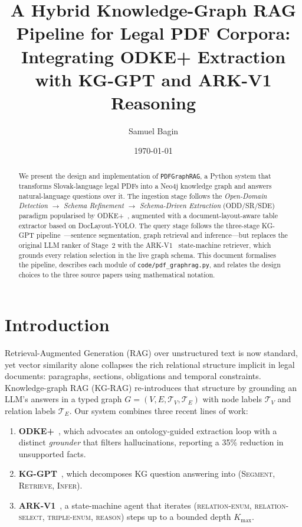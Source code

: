 \documentclass[11pt,a4paper]{article}
\title{A Hybrid Knowledge-Graph RAG Pipeline for Legal PDF Corpora:\\
Integrating ODKE+ Extraction with KG-GPT and ARK-V1 Reasoning}
\author{Samuel Bagin}
\date{\today}
\begin{document}
\maketitle

\begin{abstract}
We present the design and implementation of \texttt{PDFGraphRAG}, a Python system
that transforms Slovak-language legal PDFs into a Neo4j knowledge graph and
answers natural-language questions over it. The ingestion stage follows the
\emph{Open-Domain Detection $\rightarrow$ Schema Refinement $\rightarrow$
Schema-Driven Extraction} (ODD/SR/SDE) paradigm popularised by
ODKE+~\cite{odkeplus2025}, augmented with a document-layout-aware table
extractor based on DocLayout-YOLO. The query stage follows the three-stage
KG-GPT pipeline~\cite{kggpt2023}---sentence segmentation, graph retrieval and
inference---but replaces the original LLM ranker of Stage~2 with the
ARK-V1~\cite{arkv12025} state-machine retriever, which grounds every relation
selection in the live graph schema. This document formalises the pipeline,
describes each module of \texttt{code/pdf\_graphrag.py}, and relates the design
choices to the three source papers using mathematical notation.
\end{abstract}

\section{Introduction}

Retrieval-Augmented Generation (RAG) over unstructured text is now standard,
yet vector similarity alone collapses the rich relational structure implicit
in legal documents: paragraphs, sections, obligations and temporal
constraints. Knowledge-graph RAG (KG-RAG) re-introduces that structure by
grounding an LLM's answers in a typed graph
$G=(V,E,\mathcal{T}_V,\mathcal{T}_E)$ with node labels
$\mathcal{T}_V$ and relation labels $\mathcal{T}_E$. Our system combines three
recent lines of work:

\begin{enumerate}
    \item \textbf{ODKE+}~\cite{odkeplus2025}, which advocates an ontology-guided
    extraction loop with a distinct \emph{grounder} that filters
    hallucinations, reporting a 35\% reduction in unsupported facts.
    \item \textbf{KG-GPT}~\cite{kggpt2023}, which decomposes KG question
    answering into (\textsc{Segment}, \textsc{Retrieve}, \textsc{Infer}).
    \item \textbf{ARK-V1}~\cite{arkv12025}, a state-machine agent that iterates
    (\textsc{relation-enum}, \textsc{relation-select}, \textsc{triple-enum},
    \textsc{reason}) steps up to a bounded depth $K_{\max}$.
\end{enumerate}
\end{document}
